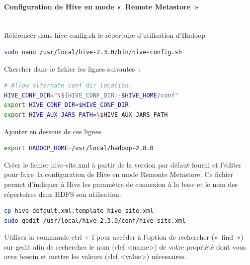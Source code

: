 \documentclass[12pt,french]{book}
\begin{document}
\paragraph{Configuration de Hive en mode « Remote Metastore » }\mbox{}\\

Référencer dans hive-config.sh le répertoire d’utilisation d’Hadoop

\begin{lstlisting}[language=bash, frame=single]
sudo nano /usr/local/hive-2.3.0/bin/hive-config.sh 
\end{lstlisting}

Chercher dans le fichier les lignes suivantes :
\begin{lstlisting}[language=bash, frame=single]
# Allow alternate conf dir location.
HIVE_CONF_DIR="\${HIVE_CONF_DIR:-$HIVE_HOME/conf"
export HIVE_CONF_DIR=$HIVE_CONF_DIR
export HIVE_AUX_JARS_PATH=\$HIVE_AUX_JARS_PATH
\end{lstlisting}

Ajouter en dessous de ces lignes

\begin{lstlisting}[language=bash, frame=single]
export HADOOP_HOME=/usr/local/hadoop-2.8.0
\end{lstlisting}

Créer le fichier hive-site.xml à partir de la version par défaut fourni et l’éditer pour faire la configuration de Hive en mode Remonte Metastore.
Ce fichier permet d’indiquer à Hive les paramètre de connexion à la base et le nom des répertoires dans HDFS son utilisation.

\begin{lstlisting}[language=bash, frame=single]
cp hive-default.xml.template hive-site.xml
sudo gedit /usr/local/hive-2.3.0/conf/hive-site.xml 
\end{lstlisting}

Utilisez la commande ctrl + f pour accéder à l’option de rechercher (« find ») sur gedit afin de rechercher le nom (clef <name>) de votre propriété dont vous avez besoin et mettre les valeurs (clef <value>) nécessaires. 
\end{document}
